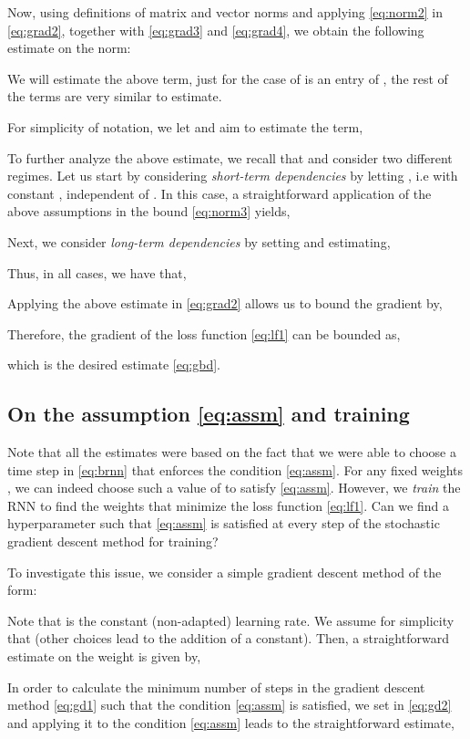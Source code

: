 \documentclass{article} \usepackage{iclr2021_conference,times}
\begin{document}
Now, using definitions of matrix and vector norms and applying \eqref{eq:norm2} in \eqref{eq:grad2}, together with \eqref{eq:grad3} and \eqref{eq:grad4}, we obtain the following estimate on the norm:

We will estimate the above term, just for the case of  is an entry of , the rest of the terms are very similar to estimate. 



For simplicity of notation, we let  and aim to estimate the term,

To further analyze the above estimate, we recall that  and consider two different regimes. Let us start by considering \emph{short-term dependencies} by letting , i.e  with constant , independent of . In this case, a
straightforward application of the above assumptions in the bound \eqref{eq:norm3} yields,
 


Next, we consider \emph{long-term dependencies} by setting  and estimating,
 
Thus, in all cases, we have that,
 

Applying the above estimate in \eqref{eq:grad2} allows us to bound the gradient by,

Therefore, the gradient of the loss function \eqref{eq:lf1} can be bounded as,

which is the desired estimate \eqref{eq:gbd}. 
\subsection{On the assumption \eqref{eq:assm} and training}
\label{app:explod_training}
Note that all the estimates were based on the fact that we were able to choose a time step  in \eqref{eq:brnn} that enforces the condition \eqref{eq:assm}. For any fixed weights , we can indeed choose such a value of  to satisfy \eqref{eq:assm}. However, we \emph{train} the RNN to find the weights that minimize the loss function \eqref{eq:lf1}. Can we find a hyperparameter  such that \eqref{eq:assm} is satisfied at every step of the stochastic gradient descent method for training?

To investigate this issue, we consider a simple gradient descent method of the form:

Note that  is the constant (non-adapted) learning rate. We assume for simplicity that  (other choices lead to the addition of a constant). Then, a straightforward estimate on the weight is given by,

In order to calculate the minimum number of steps  in the gradient descent method \eqref{eq:gd1} such that the condition \eqref{eq:assm} is satisfied, we set  in \eqref{eq:gd2} and applying it to the condition \eqref{eq:assm} leads to the straightforward estimate,
\end{document}
